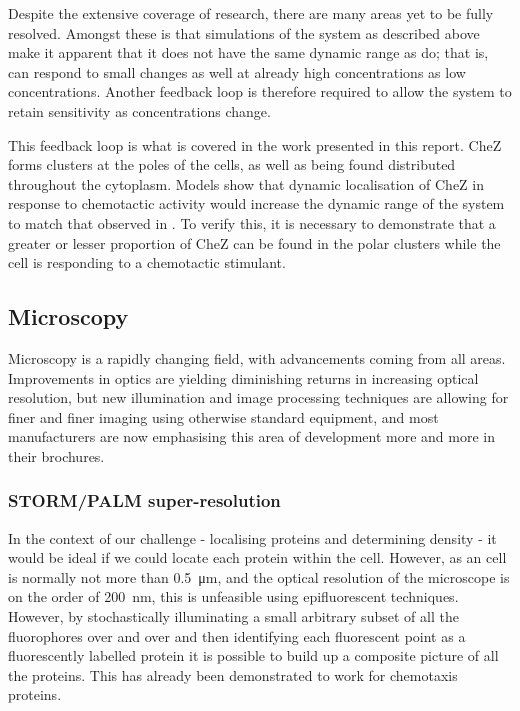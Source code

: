 \documentclass[../main.tex]{subfiles}
\begin{document}
Despite the extensive coverage of research, there are many areas yet to be fully resolved. Amongst these is that simulations of the system as described above make it apparent that it does not have the same dynamic range as \ecoli do; that is, \ecoli can respond to small changes as well at already high concentrations as low concentrations. Another feedback loop is therefore required to allow the system to retain sensitivity as concentrations change.

This feedback loop is what is covered in the work presented in this report. CheZ forms clusters at the poles of the cells, as well as being found distributed throughout the cytoplasm. Models show that dynamic localisation of CheZ in response to chemotactic activity would increase the dynamic range of the system to match that observed in \ecoli\cite{lipkow06}. To verify this, it is necessary to demonstrate that a greater or lesser proportion of CheZ can be found in the polar clusters while the cell is responding to a chemotactic stimulant.

\subsection{Microscopy}

Microscopy is a rapidly changing field, with advancements coming from all areas. Improvements in optics are yielding diminishing returns in increasing optical resolution, but new illumination and image processing techniques are allowing for finer and finer imaging using otherwise standard equipment, and most manufacturers are now emphasising this area of development more and more in their brochures.

\subsubsection{STORM/PALM super-resolution}
In the context of our challenge - localising proteins and determining density - it would be ideal if we could locate each protein within the \ecoli cell. However, as an \ecoli cell is normally not more than \SI{0.5}{\micro\meter}, and the optical resolution of the microscope is on the order of \SI{200}{\nano\meter}, this is unfeasible using epifluorescent techniques. However, by stochastically illuminating a small arbitrary subset of all the fluorophores over and over and then identifying each fluorescent point as a fluorescently labelled protein it is possible to build up a composite picture of all the proteins. This has already been demonstrated to work for \ecoli chemotaxis proteins.
\end{document}
